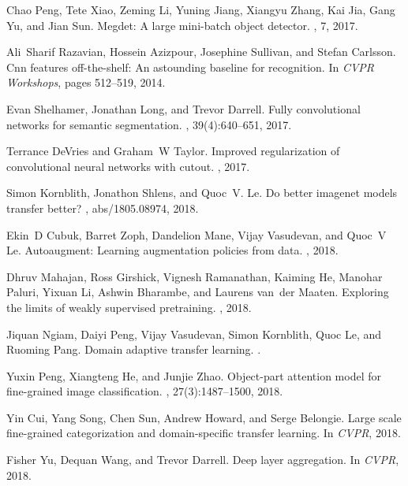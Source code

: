 \documentclass{article}
\begin{document}
\begin{thebibliography}{10}
Chao Peng, Tete Xiao, Zeming Li, Yuning Jiang, Xiangyu Zhang, Kai Jia, Gang Yu,
  and Jian Sun.
\newblock Megdet: A large mini-batch object detector.
, 7, 2017.

Ali~Sharif Razavian, Hossein Azizpour, Josephine Sullivan, and Stefan Carlsson.
\newblock Cnn features off-the-shelf: An astounding baseline for recognition.
\newblock In {\em CVPR Workshops}, pages 512--519, 2014.

Evan Shelhamer, Jonathan Long, and Trevor Darrell.
\newblock Fully convolutional networks for semantic segmentation.
, 39(4):640--651,
  2017.

Terrance DeVries and Graham~W Taylor.
\newblock Improved regularization of convolutional neural networks with cutout.
, 2017.

Simon Kornblith, Jonathon Shlens, and Quoc~V. Le.
\newblock Do better imagenet models transfer better?
, abs/1805.08974, 2018.

Ekin~D Cubuk, Barret Zoph, Dandelion Mane, Vijay Vasudevan, and Quoc~V Le.
\newblock Autoaugment: Learning augmentation policies from data.
, 2018.

Dhruv Mahajan, Ross Girshick, Vignesh Ramanathan, Kaiming He, Manohar Paluri,
  Yixuan Li, Ashwin Bharambe, and Laurens van~der Maaten.
\newblock Exploring the limits of weakly supervised pretraining.
, 2018.

Jiquan Ngiam, Daiyi Peng, Vijay Vasudevan, Simon Kornblith, Quoc Le, and
  Ruoming Pang.
\newblock Domain adaptive transfer learning.
.

Yuxin Peng, Xiangteng He, and Junjie Zhao.
\newblock Object-part attention model for fine-grained image classification.
, 27(3):1487--1500, 2018.

Yin Cui, Yang Song, Chen Sun, Andrew Howard, and Serge Belongie.
\newblock Large scale fine-grained categorization and domain-specific transfer
  learning.
\newblock In {\em CVPR}, 2018.

Fisher Yu, Dequan Wang, and Trevor Darrell.
\newblock Deep layer aggregation.
\newblock In {\em CVPR}, 2018.


\end{thebibliography}
\end{document}
